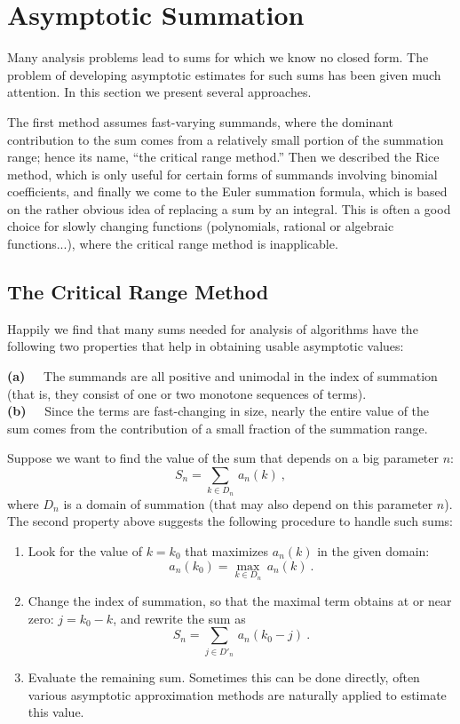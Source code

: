 \documentclass[11pt]{article}
\newcommand{\bc}{binomial coefficient\xspace}
\begin{document}
\section{Asymptotic Summation}
Many analysis problems lead to sums for which we know no closed form.
The problem of developing asymptotic estimates for such sums has been
given much attention.  In this section we present several approaches.

The first method assumes fast-varying summands, where the dominant
contribution to the sum comes from a relatively small portion of the
summation range; hence its name, ``the critical range method.''
Then we described the Rice method, which is only useful for certain forms
of summands involving \bc{s}, and finally 
we come to the Euler summation formula,
which is based on the rather obvious idea of
replacing a sum by an integral.  This is often a good choice
for slowly changing
functions (polynomials, rational or algebraic functions...), where the
critical range method is inapplicable.

\subsection{The Critical Range Method}\label{crm}
Happily we find that many sums needed for analysis of algorithms
have the following
two properties that help in obtaining usable asymptotic values: 

{\bf(a)\ \ } The summands are all positive and unimodal in the index
of summation (that is, they consist of one or two monotone
sequences of terms). \\
{\bf(b)\ \ } Since the terms are fast-changing in size, nearly the
entire value of the sum comes from the contribution of a small fraction
of the summation range.

Suppose we want to find the value of the sum that depends on a big parameter
$n$:
\[
S_n = \sum_{k\in D_n} \,a_n (k) \ ,
\]
where $D_n$ is a domain of summation (that may also depend on this parameter
$n$).  The second property above suggests the following procedure to
handle such sums: 
\begin{enumerate}
\item Look for the value of $k = k_0$ that maximizes $a_n (k)$ in
the given domain:
\begin{equation}\label{E112.21}
a_n ( k_0 ) = \max_{k\in D_n} \,a_n (k) \ .
\end{equation}
\item Change the index of summation, so that the maximal term obtains at or
near zero: $j=k_0 -k$, and rewrite the sum as
\[
S_n = \sum_{j\in D'_n} \,a_n (k_0 -j) \ .
\]
\item Evaluate the remaining sum. Sometimes this can be done directly, often
various asymptotic approximation methods are naturally applied to estimate
this value. 
\end{enumerate}
\end{document}
